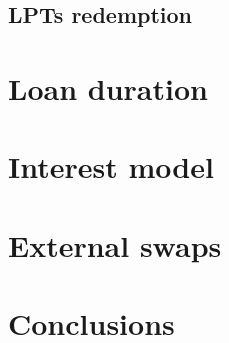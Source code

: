 \documentclass[12pt]{paper}
\begin{document}
	\subsection{LPTs redemption}
	\label{subsec:redemption}

\section{Loan duration}
\label{sec:duration}

\section{Interest model}
\label{sec:interest}

\section{External swaps}

\section{Conclusions}
\label{sec:conclusions}
\end{document}
